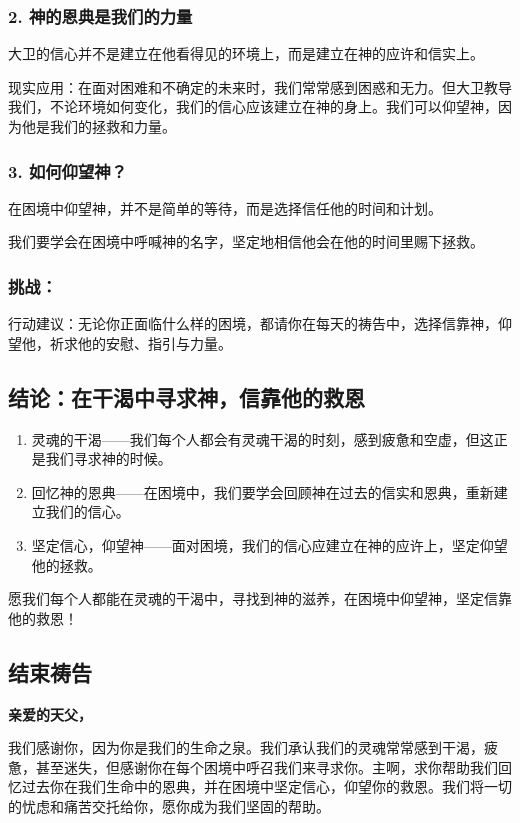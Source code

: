 \documentclass[a4paper, 12pt]{article}
\begin{document}
\subsubsection*{2. 神的恩典是我们的力量}
\hspace{0.6cm}大卫的信心并不是建立在他看得见的环境上，而是建立在神的应许和信实上。

现实应用：在面对困难和不确定的未来时，我们常常感到困惑和无力。但大卫教导我们，不论环境如何变化，我们的信心应该建立在神的身上。我们可以仰望神，因为他是我们的拯救和力量。
\subsubsection*{3. 如何仰望神？}
\hspace{0.6cm}在困境中仰望神，并不是简单的等待，而是选择信任他的时间和计划。

我们要学会在困境中呼喊神的名字，坚定地相信他会在他的时间里赐下拯救。
\subsubsection*{挑战：}

行动建议：无论你正面临什么样的困境，都请你在每天的祷告中，选择信靠神，仰望他，祈求他的安慰、指引与力量。
\subsection*{结论：在干渴中寻求神，信靠他的救恩}
\begin{enumerate}
    \item 灵魂的干渴——我们每个人都会有灵魂干渴的时刻，感到疲惫和空虚，但这正是我们寻求神的时候。

    \item 回忆神的恩典——在困境中，我们要学会回顾神在过去的信实和恩典，重新建立我们的信心。

    \item 坚定信心，仰望神——面对困境，我们的信心应建立在神的应许上，坚定仰望他的拯救。

\end{enumerate}

愿我们每个人都能在灵魂的干渴中，寻找到神的滋养，在困境中仰望神，坚定信靠他的救恩！

\subsection*{结束祷告}

\textbf{亲爱的天父，}

我们感谢你，因为你是我们的生命之泉。我们承认我们的灵魂常常感到干渴，疲惫，甚至迷失，但感谢你在每个困境中呼召我们来寻求你。主啊，求你帮助我们回忆过去你在我们生命中的恩典，并在困境中坚定信心，仰望你的救恩。我们将一切的忧虑和痛苦交托给你，愿你成为我们坚固的帮助。
\end{document}
